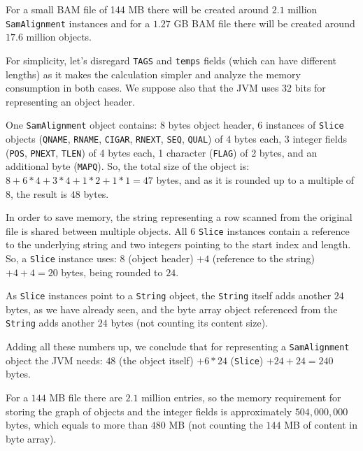 \documentclass[a4paper,twoside]{article}
\begin{document}
For a small BAM file of 144 MB there will be created around $2.1$ million \texttt{SamAlignment} instances and for a $1.27$ GB BAM file there will be created around $17.6$ million objects.

For simplicity, let's disregard \texttt{TAGS} and \texttt{temps} fields (which can have different lengths) as it makes the calculation simpler and analyze the memory consumption in both cases.
We suppose also that the JVM uses 32 bits for representing an object header.

One {\texttt{SamAlignment}} object contains:
8 bytes object header, 6 instances of \texttt{Slice} objects (\texttt{QNAME}, \texttt{RNAME}, \texttt{CIGAR}, \texttt{RNEXT}, \texttt{SEQ}, \texttt{QUAL}) of 4 bytes each, 3 integer fields ({\texttt{POS}}, {\texttt{PNEXT}}, {\texttt{TLEN}}) of 4 bytes each, 1 character ({\texttt{FLAG}}) of 2 bytes, and an additional byte ({\texttt{MAPQ}}).
So, the total size of the object is: $8 + 6 * 4 + 3*4  + 1 * 2+ 1 * 1 = 47$ bytes, and as it is rounded up to a multiple of $8$, the result is $48$ bytes.

In order to save memory, the string representing a row scanned from the original file is shared between multiple objects.
All $6$ {\texttt{Slice}} instances contain a reference to the  underlying string and two integers pointing to the start index and length.
So, a {\texttt{Slice}} instance uses: $8$ (object header) $+4$ (reference to the string) $ + 4 + 4 = 20$ bytes, being rounded to $24$.


As {\texttt{Slice}} instances point to a {\texttt{String}} object, the {\texttt{String}} itself adds another $24$ bytes, as we have already seen, and the byte array object referenced from the {\texttt{String}} adds another $24$ bytes (not counting its content size).


Adding all these numbers up, we conclude that for representing a {\texttt{SamAlignment}} object the JVM needs: $48$ (the object itself) $ + 6*24$ (\texttt{Slice}) $ + 24 + 24 = 240$ bytes.

For a $144$ MB file there are $2.1$ million entries, so the memory requirement for storing the graph of objects and the integer fields is approximately $504,000,000$ bytes, which equals to more than $480$ MB (not counting the $144$ MB of content in byte array).
\end{document}

